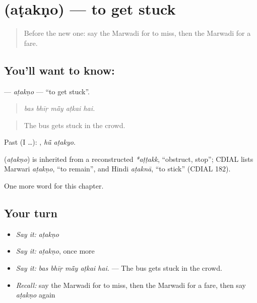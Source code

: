 \section[\texorpdfstring{\mw{अटकणो} (aṭakṇo)}{अटकणो (aṭakṇo)}]{ (aṭakṇo) — to get stuck}

\label{lesson:MW-C205-atakno}



\begin{quote}
Before the new one: say the Marwadi for to miss, then the Marwadi for a fare.
\end{quote}

\subsection*{You'll want to know: }
\textbf{} — \emph{aṭakṇo} — \textquotedblleft{}to get stuck\textquotedblright{}.

\begin{quote}
    
\end{quote}

\begin{quote}
\emph{bas bhīṛ mā̃y aṭkai hai.}
\end{quote}

\begin{quote}
The bus gets stuck in the crowd.
\end{quote}

Past (I …):  , \emph{hū̃ aṭakyo}.

\begin{cousinweb}
\textbf{} (\emph{aṭakṇo}) is inherited from a reconstructed \emph{*aṭṭakk}, \textquotedblleft{}obstruct, stop\textquotedblright{}; CDIAL lists Marwari \emph{aṭakṇo}, \textquotedblleft{}to remain\textquotedblright{}, and Hindi \emph{aṭaknā}, \textquotedblleft{}to stick\textquotedblright{} (CDIAL 182).
\end{cousinweb}

\begin{grammarlens}[title={What you've built}]
One more word for this chapter.
\end{grammarlens}

\subsection*{Your turn}
\begin{itemize}
\raggedright
  \item \emph{Say it:} \emph{aṭakṇo}
  \item \emph{Say it:} \emph{aṭakṇo}, once more
  \item \emph{Say it:} \emph{bas bhīṛ mā̃y aṭkai hai.} — The bus gets stuck in the crowd.
  \item \emph{Recall:} say the Marwadi for to miss, then the Marwadi for a fare, then say \emph{aṭakṇo} again
\end{itemize}

